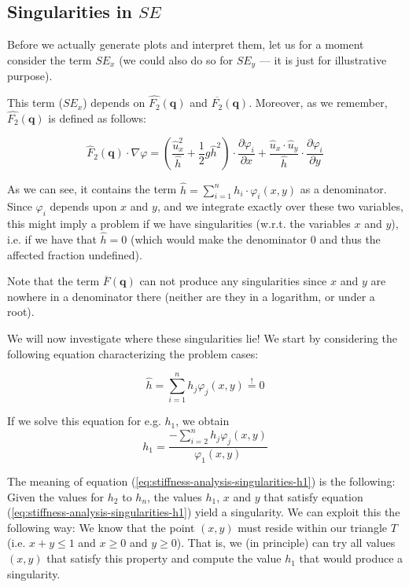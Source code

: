 \documentclass{article}
\newcommand{\pd}[2]{\dfrac{\partial #1}{\partial #2}}
\renewcommand{\phi}{\varphi}
\begin{document}
\subsection{\texorpdfstring{Singularities in $SE$}{Singularities in SE}}
\label{sec:stiffness-analysis-singularities}

Before we actually generate plots and interpret them, let us for a moment consider the term $SE_x$ (we could also do so for $SE_y$ --- it is just for illustrative purpose).

This term ($SE_x$) depends on $\widehat{F_2}(\mathbf{q})$ and $\overline{F_2}(\mathbf{q})$. Moreover, as we remember, $\widehat{F_2}(\mathbf{q})$ is defined as follows:

\begin{equation*}
  \widehat{F}_2(\mathbf{q}) \cdot \nabla \phi =
  \left( \frac{\widehat{u}_x^2}{\widehat{h}} + \frac{1}{2} g \widehat{h}^2 \right) \cdot \pd{\phi_i}{x} +
  \frac{\widehat{u}_x \cdot \widehat{u}_y }{\widehat{h}} \cdot \pd{\phi_i}{y}
\end{equation*}

As we can see, it contains the term $\widehat{h} = \sum_{i=1}^n h_i \cdot \phi_i(x,y)$ as a denominator. Since $\phi_i$ depends upon $x$ and $y$, and we integrate exactly over these two variables, this might imply a problem if we have singularities (w.r.t. the variables $x$ and $y$), i.e. if we have that $\widehat h = 0$ (which would make the denominator 0 and thus the affected fraction undefined).

Note that the term $\overline{F}(\mathbf{q})$ can not produce any singularities since $x$ and $y$ are nowhere in a denominator there (neither are they in a logarithm, or under a root).

We will now investigate where these singularities lie! We start by considering the following equation characterizing the problem cases:

\begin{equation*}
  \widehat{h} = \sum_{i=1}^n h_j \phi_j(x,y) \stackrel{!}{=} 0
\end{equation*}

If we solve this equation for e.g. $h_1$, we obtain
\begin{equation}
  \label{eq:stiffness-analysis-singularities-h1}
  h_1 = \frac{-\sum_{i=2}^n h_j \phi_j(x,y)}{\phi_1(x,y)}
\end{equation}

The meaning of equation (\ref{eq:stiffness-analysis-singularities-h1}) is the following: Given the values for $h_2$ to $h_n$, the values $h_1$, $x$ and $y$ that satisfy equation (\ref{eq:stiffness-analysis-singularities-h1}) yield a singularity. We can exploit this the following way: We know that the point $(x,y)$ must reside within our triangle $T$ (i.e. $x+y\leq 1$ and $x\geq 0$ and $y\geq 0$). That is, we (in principle) can try all values $(x,y)$ that satisfy this property and compute the value $h_1$ that would produce a singularity.
\end{document}
